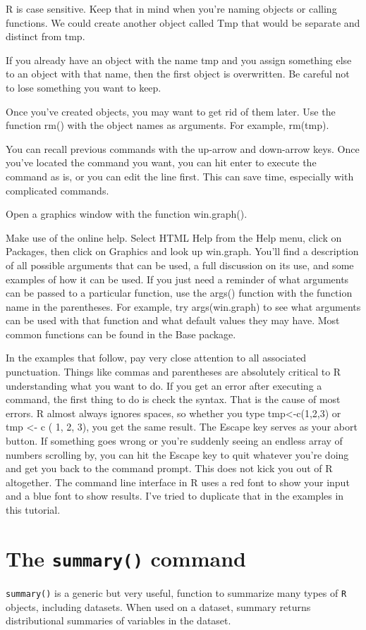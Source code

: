 \documentclass[a4paper,12pt]{article}
\begin{document}
R is case sensitive. Keep that in mind when you're naming objects or calling functions. We could create another object called Tmp that would be separate and distinct from tmp. 

If you already have an object with the name tmp and you assign something else to an object with that name, then the first object is overwritten. Be careful not to lose something you want to keep. 

Once you've created objects, you may want to get rid of them later. Use the function rm() with the object names as arguments. For example, rm(tmp). 

You can recall previous commands with the up-arrow and down-arrow keys. Once you've located the command you want, you can hit enter to execute the command as is, or you can edit the line first. This can save time, especially with complicated commands. 

Open a graphics window with the function win.graph(). 

Make use of the online help. Select HTML Help from the Help menu, click on Packages, then click on Graphics and look up win.graph. You'll find a description of all possible arguments that can be used, a full discussion on its use, and some examples of how it can be used. If you just need a reminder of what arguments can be passed to a particular function, use the args() function with the function name in the parentheses. For example, try args(win.graph) to see what arguments can be used with that function and what default values they may have. Most common functions can be found in the Base package. 

In the examples that follow, pay very close attention to all associated punctuation. Things like commas and parentheses are absolutely critical to R understanding what you want to do. If you get an error after executing a command, the first thing to do is check the syntax. That is the cause of most errors. R almost always ignores spaces, so whether you type tmp<-c(1,2,3) or tmp <- c ( 1, 2, 3), you get the same result. 
The Escape key serves as your abort button. If something goes wrong or you're suddenly seeing an endless array of numbers scrolling by, you can hit the Escape key to quit whatever you're doing and get you back to the command prompt. This does not kick you out of R altogether. 
The command line interface in R uses a red font to show your input and a blue font to show results. I've tried to duplicate that in the examples in this tutorial. 

\section{The \texttt{summary()} command}
\texttt{summary()} is a generic but very useful, function to summarize many types of \texttt{R} objects, including datasets. When used on a dataset, summary returns distributional summaries of variables in the dataset.
\end{document}
